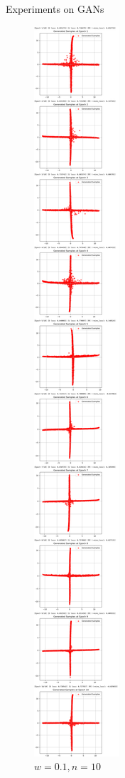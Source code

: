 \documentclass[final]{beamer}
\newlength{\colwidth}
\begin{document}
\begin{frame}[t]
\begin{columns}[t]
\begin{column}{\colwidth}
\begin{block}{Experiments on GANs}
\begin{figure}
\begin{minipage}{0.19\textwidth}
    \caption{$w=1,n=10$}
    \end{minipage}
    \begin{minipage}{0.19\textwidth}
    \centering
    \includegraphics[width=1\linewidth]{gan_cross/n=10/Jietu20250101-162207@2x.png}
    \caption{$w=0.1,n=10$}
    \end{minipage}
    \end{figure}


\end{block}
\end{column}
\end{columns}
\end{frame}
\end{document}

